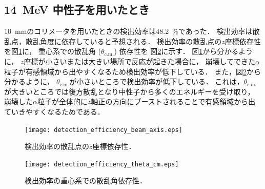 \documentclass[../master]{subfiles}
\begin{document}
\subsection{14~MeV 中性子を用いたとき}
\SI{10}{\milli\metre}のコリメータを用いたときの検出効率は\SI{48.2}{\percent}であった．
検出効率は散乱点，散乱角度に依存していると予想される．
検出効率の散乱点の$z$座標依存性を図\ref{fig::detection_efficiency_beam_axis}に，
重心系での散乱角 ($\theta_{\text{c.m.}}$) 依存性を
図\ref{fig::detection_efficiency_theta_cm}に示す．
図\ref{fig::detection_efficiency_beam_axis}から分かるように，
$z$座標が小さいまたは大きい場所で反応が起きた場合に，
崩壊してできた$\alpha$粒子が有感領域から出やすくなるため検出効率が低下している．
また，図\ref{fig::detection_efficiency_theta_cm}から分かるように，
$\theta_{\text{c.m.}}$が小さいところで検出効率が低下している．
これは，$\theta_{\text{c.m.}}$が大きいところでは後方散乱となり中性子から多くのエネルギーを受け取り，
崩壊した$\alpha$粒子が全体的に$z$軸正の方向にブーストされることで有感領域から出ていきやすくなるためである．
\begin{figure}
  \centering
  \texttt{[image: detection\_efficiency\_beam\_axis.eps]}
  \caption{検出効率の散乱点の$z$座標依存性．}
  \label{fig::detection_efficiency_beam_axis}
\end{figure}
\begin{figure}
  \centering
  \texttt{[image: detection\_efficiency\_theta\_cm.eps]}
  \caption{検出効率の重心系での散乱角依存性．}
  \label{fig::detection_efficiency_theta_cm}
\end{figure}
\end{document}
